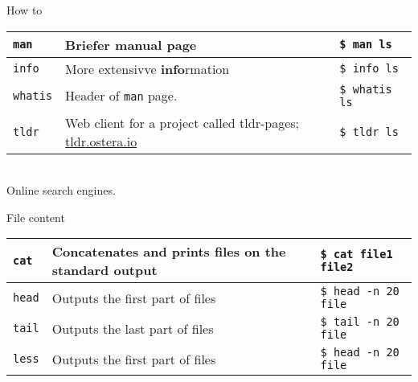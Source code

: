 \documentclass{beamer}
\let\tt\texttt
\let\bf\textbf
\begin{document}
\begin{frame}{How to}
        \begin{tabular}{p{} p{} | p{}}
                \hline
                \tt{man}                    &
                Briefer \bf{man}ual page    &
                \tt{\$ man ls}              \\
                \hline
                \tt{info}                           &
                More extensivve \bf{info}rmation    &
                \tt{\$ info ls}                     \\
                \hline
                \tt{whatis}                         &
                Header of \tt{man} page.            &
                \tt{\$ whatis ls}                   \\
                \hline
                \tt{tldr}             &
                Web client for a project called tldr-pages; 
                \url{tldr.ostera.io} &
                \tt{\$ tldr ls}       \\
                \hline
        \end{tabular}   \\
        Online search engines.
\end{frame}

\begin{frame}{File content}
        \begin{tabular}{p{} p{} | p{}}
                \hline
                \tt{cat}             &
                Concatenates and prints files on the standard output &
                \tt{\$ cat file1 file2}       \\
                \hline
                \tt{head}             &
                Outputs the first part of files &
                \tt{\$ head -n 20 file}       \\
                \hline
                \tt{tail}             &
                Outputs the last part of files &
                \tt{\$ tail -n 20 file}       \\
                \hline
                \tt{less}             &
                Outputs the first part of files &
                \tt{\$ head -n 20 file}       \\
                \hline
        \end{tabular}  
\end{frame}
\end{document}
